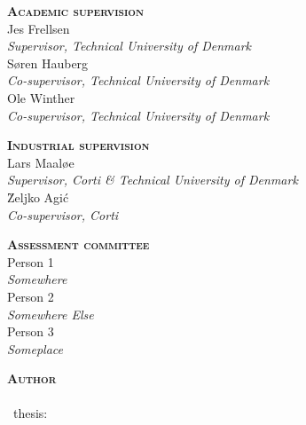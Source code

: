 

\thispagestyle{empty} %

\hfill\vfill

\noindent
\small%
\textsc{\textbf{Academic supervision}}
\medskip
\\Jes Frellsen\\
\textit{Supervisor, Technical University of Denmark}
\medskip
\\Søren Hauberg\\
\textit{Co-supervisor, Technical University of Denmark}
\medskip
\\Ole Winther\\
\textit{Co-supervisor, Technical University of Denmark}
\medskip

\bigskip
\noindent
\textsc{\textbf{Industrial supervision}}
\medskip
\\Lars Maaløe\\
\textit{Supervisor, Corti \& Technical University of Denmark}
\medskip
\\\u{Z}eljko Agi\'c\\
\textit{Co-supervisor, Corti}
\medskip

\bigskip
\noindent
\textsc{\textbf{Assessment committee}}
\medskip
\\Person 1\\
\textit{Somewhere}
\medskip
\\Person 2\\
\textit{Somewhere Else}
\medskip
\\Person 3\\
\textit{Someplace}
\medskip

\bigskip
\noindent
\textsc{\textbf{Author}}
\medskip
\\\thesisauthor\\
\thesistypeabbr\ thesis:\\
\textit{\thesistitle}\\
\textcopyright\ \thesismonth\ \thesisyear

\normalsize
\normalfont
